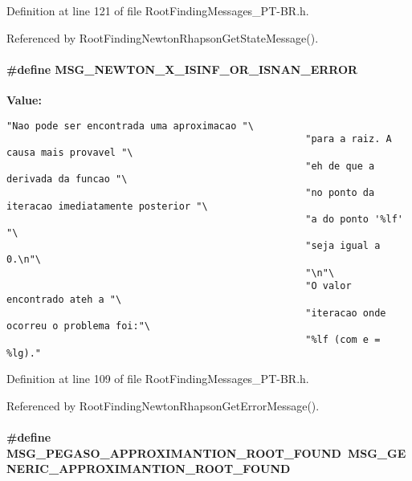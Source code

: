 Definition at line 121 of file RootFindingMessages\_\-PT-BR.h.

Referenced by RootFindingNewtonRhapsonGetStateMessage().\hypertarget{group____messages_g2e4a5cee2ec2eb38f4849592b3a5c126}{
\paragraph[MSG\_\-NEWTON\_\-X\_\-ISINF\_\-OR\_\-ISNAN\_\-ERROR]{\setlength{\rightskip}{0pt plus 5cm}\#define MSG\_\-NEWTON\_\-X\_\-ISINF\_\-OR\_\-ISNAN\_\-ERROR}\hfill}
\label{group____messages_g2e4a5cee2ec2eb38f4849592b3a5c126}


\textbf{Value:}

\begin{Code}\begin{verbatim}"Nao pode ser encontrada uma aproximacao "\
                                                    "para a raiz. A causa mais provavel "\
                                                    "eh de que a derivada da funcao "\
                                                    "no ponto da iteracao imediatamente posterior "\
                                                    "a do ponto '%lf' "\
                                                    "seja igual a 0.\n"\
                                                    "\n"\
                                                    "O valor encontrado ateh a "\
                                                    "iteracao onde ocorreu o problema foi:"\
                                                    "%lf (com e = %lg)."
\end{verbatim}
\end{Code}


Definition at line 109 of file RootFindingMessages\_\-PT-BR.h.

Referenced by RootFindingNewtonRhapsonGetErrorMessage().\hypertarget{group____messages_g4d326b97fe84c2b5bb115e5c98e7b10e}{
\paragraph[MSG\_\-PEGASO\_\-APPROXIMANTION\_\-ROOT\_\-FOUND]{\setlength{\rightskip}{0pt plus 5cm}\#define MSG\_\-PEGASO\_\-APPROXIMANTION\_\-ROOT\_\-FOUND~MSG\_\-GENERIC\_\-APPROXIMANTION\_\-ROOT\_\-FOUND}\hfill}
\label{group____messages_g4d326b97fe84c2b5bb115e5c98e7b10e}




